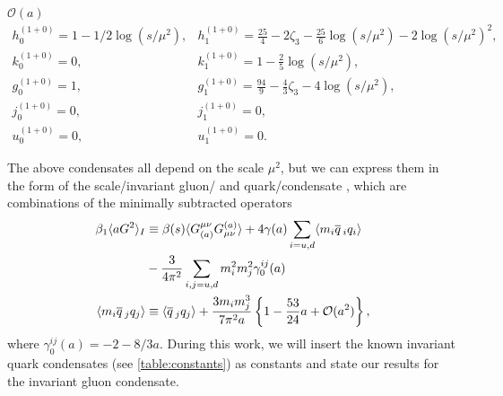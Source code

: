\documentclass[../../index.tex]{subfiles}
\begin{document}
\(\mathcal{O}(a)\)
\begin{equation}
  \begin{array}{ll}
    h_0^{(1+0)}=1-1/2 \log(s/\mu^2), & h_1^{(1+0)}=\frac{25}{4}-2\zeta_3-\frac{25}{6}\log(s/\mu^2)-2 \log(s/\mu^2)^2, \\
    k_0^{(1+0)}=0, & k_1^{(1+0)}=1-\frac{2}{5}\log(s/\mu^2), \\
    g_0^{(1+0)}=1, & g_1^{(1+0)}=\frac{94}{9}-\frac{4}{3}\zeta_3-4 \log(s/\mu^2), \\
    j_0^{(1+0)}=0, & j_1^{(1+0)}=0, \\
    u_0^{(1+0)}=0, & u_1^{(1+0)}=0.
  \end{array}
\end{equation}

The above condensates all depend on the scale \(\mu^2\), but we can express them
in the form of the scale\-/invariant gluon\-/ and quark\-/condensate
\cite{Spiridonov1988}, which are combinations of the minimally subtracted
operators
\begin{align}
  \beta_1 \langle a G^2 \rangle_I
  &\equiv \beta(s) \langle
    G_{(a)}^{\mu\nu}G_{\mu\nu}^{(a)} \rangle + 4 \gamma(a) \sum_{i=u,d} \langle
    m_i \overline{q}\,_i q_i \rangle \nonumber \\ 
  &- \frac{3}{4\pi^2} \sum_{i,j=u,d} m_i^2m_j^2
    \gamma_0^{ij}(a) \\
  \langle  m_i \overline{q}\,_j q_j \rangle
  &\equiv \langle \overline{q}\,_j q_j \rangle
    +\frac{3 m_i m_j^3}{7 \pi^2 a} \left\{ 1 - \frac{53}{24}a + \mathcal{O}(a^2) \right\},
\end{align}
where \(\gamma_0^{ij}(a) = -2 - 8/3 a\). During this work, we will insert the
known invariant quark condensates (see \cref{table:constants}) as constants and
state our results for the invariant gluon condensate.
\end{document}
